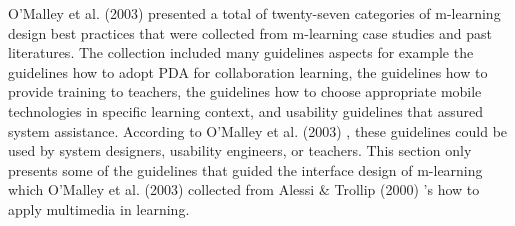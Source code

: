 O'Malley et al. (2003) \cite{o2003guidelines} presented a total of twenty-seven categories of m-learning design best practices that were collected from m-learning case studies and past literatures. The collection included many guidelines aspects for example the guidelines how to adopt PDA for collaboration learning, the guidelines how to provide training to teachers, the guidelines how to choose appropriate mobile technologies in specific learning context, and usability guidelines that assured system assistance. According to O'Malley et al. (2003) \cite{o2003guidelines}, these guidelines could be used by system designers, usability engineers, or teachers. This section only presents some of the guidelines that guided the interface design of m-learning which O'Malley et al. (2003) \cite{o2003guidelines} collected from Alessi \& Trollip (2000) \cite{alessi2000multimedia}'s how to apply multimedia in learning. 
